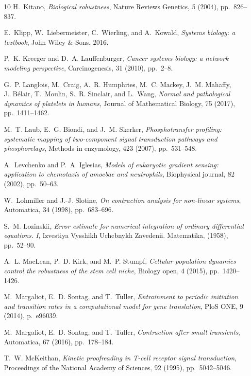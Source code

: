 \documentclass[onefignum,onetabnum]{siamonline220329}
\begin{document}
{\begin{thebibliography}{10}
	{\sc H.~Kitano}, {\em Biological robustness}, Nature Reviews Genetics, 5
	(2004), pp.~826--837.
	
	{\sc E.~Klipp, W.~Liebermeister, C.~Wierling, and A.~Kowald}, {\em Systems
		biology: a textbook}, John Wiley \& Sons, 2016.
	
	{\sc P.~K. Kreeger and D.~A. Lauffenburger}, {\em Cancer systems biology: a
		network modeling perspective}, Carcinogenesis, 31 (2010), pp.~2--8.
	
	{\sc G.~P. Langlois, M.~Craig, A.~R. Humphries, M.~C. Mackey, J.~M. Mahaffy,
		J.~B{\'e}lair, T.~Moulin, S.~R. Sinclair, and L.~Wang}, {\em Normal and
		pathological dynamics of platelets in humans}, Journal of Mathematical
	Biology, 75 (2017), pp.~1411--1462.
	
	{\sc M.~T. Laub, E.~G. Biondi, and J.~M. Skerker}, {\em Phosphotransfer
		profiling: systematic mapping of two-component signal transduction pathways
		and phosphorelays}, Methods in enzymology, 423 (2007), pp.~531--548.
	
	{\sc A.~Levchenko and P.~A. Iglesias}, {\em Models of eukaryotic gradient
		sensing: application to chemotaxis of amoebae and neutrophils}, Biophysical
	journal, 82 (2002), pp.~50--63.
	
	{\sc W.~Lohmiller and J.-J. Slotine}, {\em On contraction analysis for
		non-linear systems}, Automatica, 34 (1998), pp.~683--696.
	
	{\sc S.~M. Lozinskii}, {\em Error estimate for numerical integration of
		ordinary differential equations. {I}}, Izvestiya Vysshikh Uchebnykh
	Zavedenii. Matematika,  (1958), pp.~52--90.
	
	{\sc A.~L. MacLean, P.~D. Kirk, and M.~P. Stumpf}, {\em Cellular population
		dynamics control the robustness of the stem cell niche}, Biology open, 4
	(2015), pp.~1420--1426.
	
	{\sc M.~Margaliot, E.~D. Sontag, and T.~Tuller}, {\em Entrainment to periodic
		initiation and transition rates in a computational model for gene
		translation}, {PloS ONE}, 9 (2014), p.~e96039.
	
	{\sc M.~Margaliot, E.~D. Sontag, and T.~Tuller}, {\em Contraction after small
		transients}, Automatica, 67 (2016), pp.~178--184.
	
	{\sc T.~W. Mc{K}eithan}, {\em Kinetic proofreading in {T}-cell receptor signal
		transduction}, Proceedings of the National Academy of Sciences, 92 (1995),
	pp.~5042--5046.
	

\end{thebibliography}}
\end{document}
